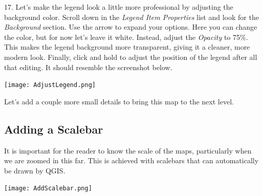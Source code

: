 \documentclass[oneside,a4paper,11pt,explicit]{book}
\begin{document}

17. Let's make the legend look a little more professional by adjusting the background color. Scroll down in the \textit{Legend Item Properties} list and look for the \textit{Background} section. Use the arrow to expand your options. Here you can change the color, but for now let's leave it white. Instead, adjust the \textit{Opacity} to 75\%. This makes the legend background more transparent, giving it a cleaner, more modern look. Finally, click and hold to adjust the position of the legend after all that editing. It should resemble the screenshot below.

\centerline{\texttt{[image: AdjustLegend.png]}}

Let's add a couple more small details to bring this map to the next level.

\subsection{Adding a Scalebar}

It is important for the reader to know the scale of the maps, particularly when we are zoomed in this far. This is achieved with scalebars that can automatically be drawn by QGIS. 

\centerline{\texttt{[image: AddScalebar.png]}}
\end{document}
